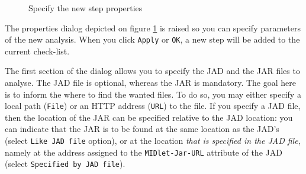 \begin{figure}[ht]
\begin{center}
\end{center}
\caption{Specify the new step properties}
\label{figNewStep}
\end{figure} 

The properties dialog depicted on figure
\ref{figNewStep} is
raised so you can specify parameters of the new analysis. When you
click \texttt{Apply} or  \texttt{OK}, a new step will be added to the
current check-list. 

The first section of the dialog allows you to
specify the JAD and the JAR files to analyse. The JAD file is
optional, whereas the JAR is mandatory. The goal here is to inform the
\ma where to find the wanted files. To do so, you may either specify a
local path (\texttt{File}) or an HTTP address (\texttt{URL}) to the
file. If you specify a JAD file, then the location of the JAR can be
specified relative to the JAD location: you can indicate that the JAR
is to be found at the same location as the JAD's (select \texttt{Like
  JAD file} option), or at the location \emph{that is specified in the
  JAD file}, namely at the address assigned to the
\texttt{MIDlet-Jar-URL} attribute of the JAD (select \texttt{Specified by
JAD file}).

